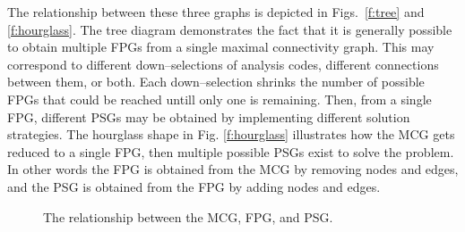 The relationship between these three graphs is depicted in Figs.~\ref{f:tree} and \ref{f:hourglass}. 
The tree diagram demonstrates the fact that it is generally possible to obtain 
multiple FPGs from a single maximal connectivity graph. This  may correspond to 
different down--selections of analysis codes, different connections between them, 
or both. Each down--selection shrinks the number of possible FPGs that could be reached 
untill only one is remaining. Then, from a single FPG, different PSGs may be obtained by implementing 
different solution strategies. The hourglass shape in Fig. \ref{f:hourglass} illustrates how 
the MCG gets reduced to a single FPG, then multiple possible PSGs exist to solve the problem.
In other words the FPG is obtained from the MCG by removing nodes and edges, 
and the PSG is obtained from the FPG by adding nodes and edges.

\begin{figure}[htb!]
    \centering
\caption{The relationship between the MCG, FPG, and PSG.}
\end{figure}





